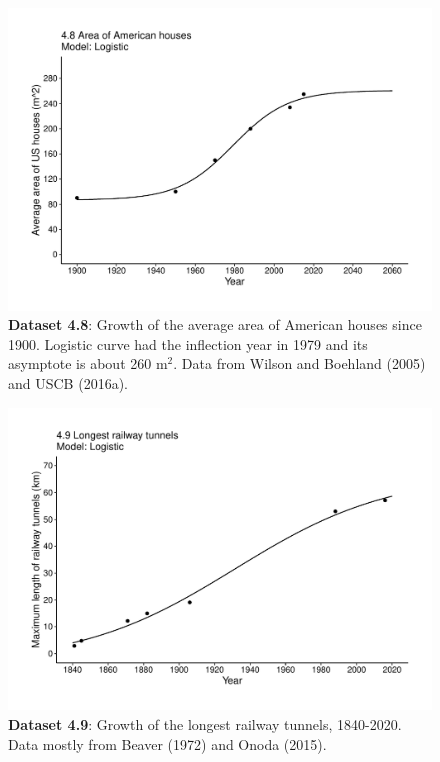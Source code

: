 \documentclass[aps,rmp,preprint,superscriptaddress,10pt,onecolumn]{article}
\begin{document}
\clearpage
\begin{figure}[h]
\includegraphics[width=\textwidth]{output/figs-ggplot/4.8.pdf}
\caption{\textbf{Dataset 4.8}: Growth of the average area of American houses since 1900. Logistic curve had the inflection year in 1979 and its asymptote is about 260 m$^2$. Data from Wilson and Boehland (2005) and USCB (2016a).}
\end{figure}
	
\clearpage
\begin{figure}[h]
\includegraphics[width=\textwidth]{output/figs-ggplot/4.9.pdf}
\caption{\textbf{Dataset 4.9}: Growth of the longest railway tunnels, 1840-2020. Data mostly from Beaver (1972) and Onoda (2015).}
\end{figure}
	
\end{document}
